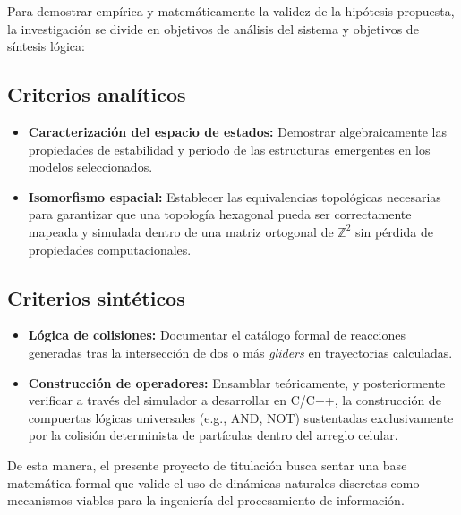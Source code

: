 Para demostrar empírica y matemáticamente la validez de la hipótesis propuesta, la investigación se divide en objetivos de análisis del sistema y objetivos de síntesis lógica:

\subsection{Criterios analíticos}
\begin{itemize}
    \item \textbf{Caracterización del espacio de estados:} Demostrar algebraicamente las propiedades de estabilidad y periodo de las estructuras emergentes en los modelos seleccionados.
    \item \textbf{Isomorfismo espacial:} Establecer las equivalencias topológicas necesarias para garantizar que una topología hexagonal pueda ser correctamente mapeada y simulada dentro de una matriz ortogonal de $\mathbb{Z}^2$ sin pérdida de propiedades computacionales.
\end{itemize}

\subsection{Criterios sintéticos}
\begin{itemize}
    \item \textbf{Lógica de colisiones:} Documentar el catálogo formal de reacciones generadas tras la intersección de dos o más \textit{gliders} en trayectorias calculadas.
    \item \textbf{Construcción de operadores:} Ensamblar teóricamente, y posteriormente verificar a través del simulador a desarrollar en C/C++, la construcción de compuertas lógicas universales (e.g., AND, NOT) sustentadas exclusivamente por la colisión determinista de partículas dentro del arreglo celular.
\end{itemize}

De esta manera, el presente proyecto de titulación busca sentar una base matemática formal que valide el uso de dinámicas naturales discretas como mecanismos viables para la ingeniería del procesamiento de información.


